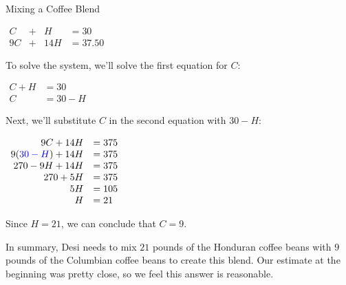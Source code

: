 \documentclass[nooutcomes]{ximera}
\begin{document}
\begin{example}{Mixing a Coffee Blend}
\begin{explanation}
\begin{center}
$
            \begin{array}{cccc}
            C&+& H&=30 \\
            9C&+& 14H&=37.50
            \end{array}
$
 \end{center}

          To solve the system, we'll solve the first equation for $C$:
\begin{center}
$
\begin{array}{rl}
            C+H&=30\\
            C&=30-H
\end{array}
$
\end{center}
          Next, we'll substitute $C$ in the second equation with $30-H$:
\begin{center}
$
    \begin{array}{rl}
            9C+14H&=375 \\
            9({\color{blue}{{30-H}}})+14H&=375 \\
            270-9H+14H&=375 \\
            270+5H&=375 \\
            5H&=105 \\
            H&=21
 \end{array}
$
\end{center}
          Since $H=21$, we can conclude that $C=9$.

          In summary, Desi needs to mix $21$ pounds of the Honduran coffee beans with $9$ pounds of the Columbian coffee beans to create this blend.
          Our estimate at the beginning was pretty close,
          so we feel this answer is reasonable.
\end{explanation}
\end{example}
\end{document}
